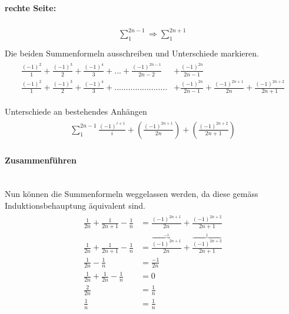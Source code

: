 \paragraph{rechte Seite:}
\begin{align}
	\begin{split}
		\sum_{1}^{2n-1} \Rightarrow \sum_{1}^{2n+1} \\
	\end{split}
\end{align}
Die beiden Summenformeln ausschreiben und Unterschiede markieren. 
\begin{align}
	\begin{split}
		\frac{(-1)^{2}}{1} + \frac{(-1)^{3}}{2} + 	\frac{(-1)^{4}}{3} + ... + \frac{(-1)^{2n-1}}{2n-2} &+\frac{(-1)^{2n}}{2n-1} \\
		\frac{(-1)^{2}}{1} + \frac{(-1)^{3}}{2} + 	\frac{(-1)^{4}}{3} + ....................... &+ \frac{(-1)^{2n}}{2n - 1} + \frac{(-1)^{2n+1}}{2n} + 	\frac{(-1)^{2n + 2}}{2n+1}
	\end{split}
\end{align}

Unterschiede an bestehendes Anhängen
\begin{align}
	\begin{split}
		\sum_{1}^{2n-1} \frac{(-1)^{i+1}}{i} + (\frac{(-1)^{2n+1}}{2n}) + (\frac{(-1)^{2n + 2}}{2n+1})
	\end{split}
\end{align}

\paragraph{Zusammenführen} \hfill \\
Nun können die Summenformeln weggelassen werden, da diese gemäss Induktionsbehauptung äquivalent sind.
\begin{align}
	\begin{split}
	\frac{1}{2n} + \frac{1}{2n+1} - \frac{1}{n} &= \frac{(-1)^{2n+1}}{2n} + \frac{(-1)^{2n + 2}}{2n+1} \\
	\frac{1}{2n} + \frac{1}{2n+1} - \frac{1}{n} &= \frac{\overbrace{(-1)^{2n+1}}^{-1}}{2n} + \frac{\overbrace{(-1)^{2n + 2}}^{1}}{2n+1} \\
	\frac{1}{2n} - \frac{1}{n} &= \frac{-1}{2n} \\
	\frac{1}{2n} + \frac{1}{2n}  - \frac{1}{n} &= 0 \\
	\frac{2}{2n} &= \frac{1}{n} \\
	\frac{1}{n} &= \frac{1}{n}
	\end{split}
\end{align}

